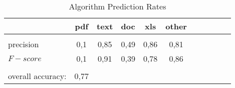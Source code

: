 \begin{table}[H]
\centering
\caption{Algorithm Prediction Rates}
\label{table:overall_results}
\colorbox{blue!25}{

\begin{tabular}{ l c c c c c c c c c c }
\hline
\hline

                 & pdf   &  text  &  doc  &  xls  & other\\ 
\hline
\\[0.2ex]
precision 		 & 0,1  &  0,85  & 0,49   & 0,86  & 0,81  \\[0.8ex]
$F-score$	 & 0,1  &  0,91  & 0,39   & 0,78  & 0,86    \\\\[0.8ex]

overall accuracy:  & 0,77 &  &  &     \\ [0.8ex]

\end{tabular}}
\end{table}